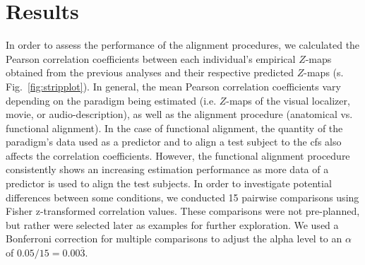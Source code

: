 \section{Results}

%
In order to assess the performance of the alignment procedures, we calculated
the Pearson correlation coefficients between each individual's empirical
$Z$-maps obtained from the previous analyses \citep{haeusler2022processing,
sengupta2016extension} and their respective predicted $Z$-maps (s.
Fig.~\ref{fig:stripplot}).
%
In general, the mean Pearson correlation coefficients vary depending on the
paradigm being estimated (i.e. $Z$-maps of the visual localizer, movie, or
audio-description), as well as the alignment procedure (anatomical vs.
functional alignment).
%
In the case of functional alignment, the quantity of the paradigm's data used as
a predictor and to align a test subject to the \ac{cfs} also affects the
correlation coefficients.
%
However, the functional alignment procedure consistently shows an increasing
estimation performance as more data of a predictor is used to align the test
subjects.
%
In order to investigate potential differences between some conditions, we
conducted 15 pairwise comparisons using Fisher z-transformed correlation values.
%
These comparisons were not pre-planned, but rather were selected later as
examples for further exploration.
%
We used a Bonferroni correction for multiple comparisons to adjust the alpha
level to an $\alpha$ of $0.05 / 15 = 0.00\overline{3}$.


